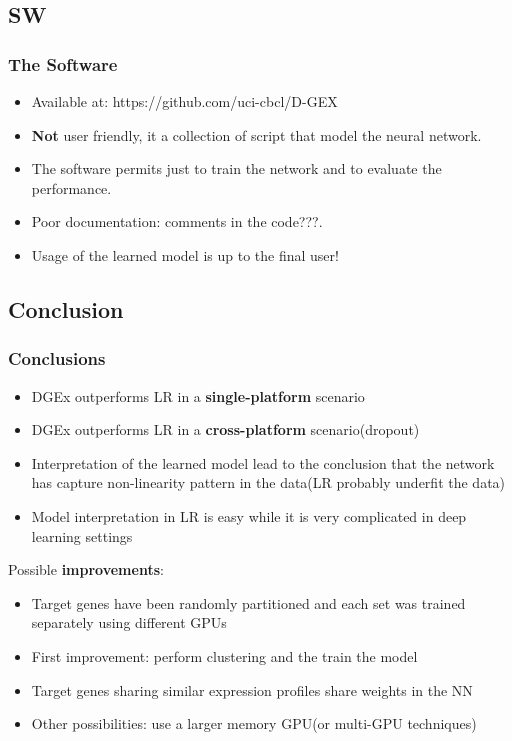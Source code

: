 \documentclass[professionalfont]{beamer}
\begin{document}
    \subsection{SW}
        \begin{frame}
          \frametitle{The Software}
            \begin{itemize}
              \item Available at: https://github.com/uci-cbcl/D-GEX
              \item \textbf{Not} user friendly, it a collection of script that model the neural network.
              \item The software permits just to train the network and to evaluate the performance.
              \item Poor documentation: comments in the code???.
              \item Usage of the learned model is up to the final user!
            \end{itemize}

        \end{frame}

    \subsection{Conclusion}
        \begin{frame}
          \frametitle{Conclusions}
          \begin{itemize}
            \item DGEx outperforms LR in a \textbf{single-platform} scenario
            \item DGEx outperforms LR in a \textbf{cross-platform} scenario(dropout)
            \item Interpretation of the learned model lead to the conclusion that
            the network has capture non-linearity pattern in the data(LR probably underfit the data)
            \item Model interpretation in LR is easy while it is very complicated in deep learning settings
          \end{itemize}
          Possible \textbf{improvements}:
          \begin{itemize}
            \item Target genes have been randomly partitioned and each set was
            trained separately using different GPUs
            \item First improvement: perform clustering and the train the model
            \item Target genes sharing similar expression profiles share weights in the NN
            \item Other possibilities: use a larger memory GPU(or multi-GPU techniques)
          \end{itemize}
        \end{frame}
\end{document}
